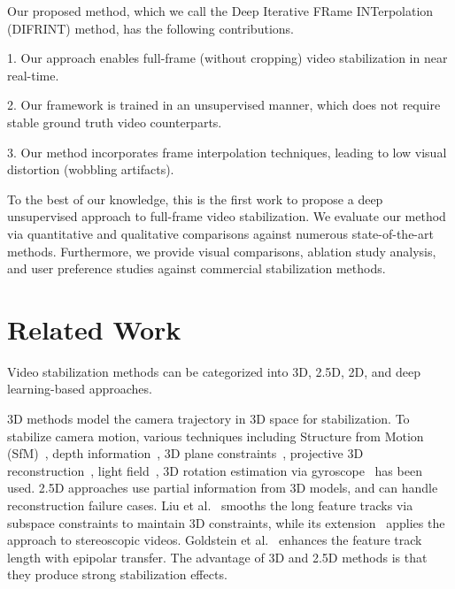 Our proposed method, which we call the Deep Iterative FRame INTerpolation (DIFRINT) method, has the following contributions.

1. Our approach enables full-frame (without cropping) video stabilization in near real-time.

2. Our framework is trained in an unsupervised manner, which does not require stable ground truth video counterparts.

3. Our method incorporates frame interpolation techniques, leading to low visual distortion (wobbling artifacts).

To the best of our knowledge, this is the first work to propose a deep unsupervised approach to full-frame video stabilization.
We evaluate our method via quantitative and qualitative comparisons against numerous state-of-the-art methods.
Furthermore, we provide visual comparisons, ablation study analysis, and user preference studies against commercial stabilization methods.




\section{Related Work}
Video stabilization methods can be categorized into 3D, 2.5D, 2D, and deep learning-based approaches.

3D methods model the camera trajectory in 3D space for stabilization.
To stabilize camera motion, various techniques including Structure from Motion (SfM)~\cite{liu2009content}, depth information~\cite{liu2012video}, 3D plane constraints~\cite{zhou2013plane}, projective 3D reconstruction~\cite{buehler2001non}, light field~\cite{smith2009light}, 3D rotation estimation via gyroscope~\cite{karpenko2011digital,bell2014non,ovren2015gyroscope} has been used.
2.5D approaches use partial information from 3D models, and can handle reconstruction failure cases.
Liu et al.~ smooths the long feature tracks via subspace constraints to maintain 3D constraints, while its extension~\cite{liu2013joint} applies the approach to stereoscopic videos.
Goldstein et al.~ enhances the feature track length with epipolar transfer.
The advantage of 3D and 2.5D methods is that they produce strong stabilization effects. 

